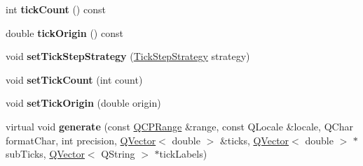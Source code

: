 \begin{DoxyCompactItemize}
\mbox{\label{class_q_c_p_axis_ticker_aaf9edbe4169ce55e216fd067cc139452}} 
int {\bfseries tick\+Count} () const
\item 
\mbox{\label{class_q_c_p_axis_ticker_ac0c6e9587c36fdeefb5518c00fe7ab15}} 
double {\bfseries tick\+Origin} () const
\item 
\mbox{\label{class_q_c_p_axis_ticker_a73b1d847c1a12159af6bfda4ebebe7d5}} 
void {\bfseries set\+Tick\+Step\+Strategy} (\hyperlink{class_q_c_p_axis_ticker_ab6d2f9d9477821623ac9bc4b21ddf49a}{Tick\+Step\+Strategy} strategy)
\item 
\mbox{\label{class_q_c_p_axis_ticker_a47752abba8293e6dc18491501ae34008}} 
void {\bfseries set\+Tick\+Count} (int count)
\item 
\mbox{\label{class_q_c_p_axis_ticker_ab509c7e500293bf66a8409f0d7c23943}} 
void {\bfseries set\+Tick\+Origin} (double origin)
\item 
\mbox{\label{class_q_c_p_axis_ticker_ae11e785e1d9ecfe7d4ba1292551b4a46}} 
virtual void {\bfseries generate} (const \hyperlink{class_q_c_p_range}{Q\+C\+P\+Range} \&range, const Q\+Locale \&locale, Q\+Char format\+Char, int precision, \hyperlink{class_q_vector}{Q\+Vector}$<$ double $>$ \&ticks, \hyperlink{class_q_vector}{Q\+Vector}$<$ double $>$ $\ast$sub\+Ticks, \hyperlink{class_q_vector}{Q\+Vector}$<$ Q\+String $>$ $\ast$tick\+Labels)
\end{DoxyCompactItemize}
